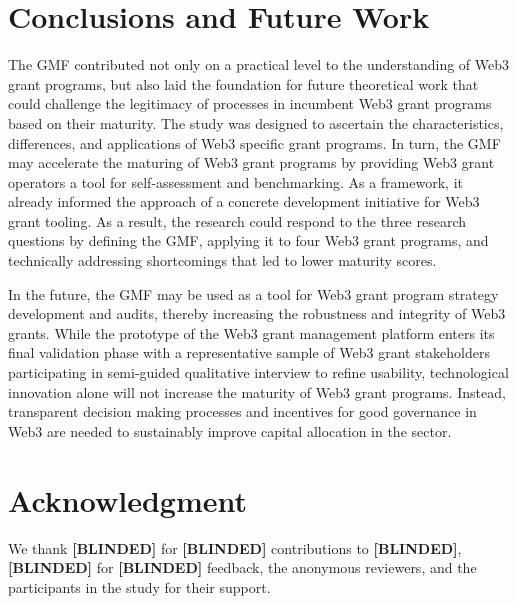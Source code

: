 \documentclass[conference]{IEEEtran}
\begin{document}
\section{Conclusions and Future Work}\label{sec_6}

The GMF contributed not only on a practical level to the understanding of Web3 grant programs, but also laid the foundation for future theoretical work that could challenge the legitimacy of processes in incumbent Web3 grant programs based on their maturity. The study was designed to ascertain the characteristics, differences, and applications of Web3 specific grant programs. In turn, the GMF may accelerate the maturing of Web3 grant programs by providing Web3 grant operators a tool for self-assessment and benchmarking. As a framework, it already informed the approach of a concrete development initiative for Web3 grant tooling. As a result, the research could respond to the three research questions by defining the GMF, applying it to four Web3 grant programs, and technically addressing shortcomings that led to lower maturity scores.

In the future, the GMF may be used as a tool for Web3 grant program strategy development and audits, thereby increasing the robustness and integrity of Web3 grants. While the prototype of the Web3 grant management platform enters its final validation phase with a representative sample of Web3 grant stakeholders participating in semi-guided qualitative interview to refine usability, technological innovation alone will not increase the maturity of Web3 grant programs. Instead, transparent decision making processes and incentives for good governance in Web3 are needed to sustainably improve capital allocation in the sector.

\section*{Acknowledgment}

We thank \textbf{[BLINDED]} for \textbf{[BLINDED]} contributions to \textbf{[BLINDED]}, \textbf{[BLINDED]} for \textbf{[BLINDED]} feedback, the anonymous reviewers, and the participants in the study for their support.



\end{document}
